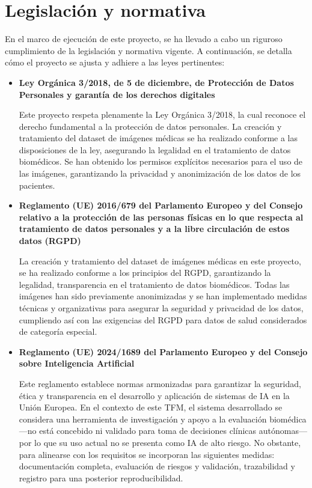 \documentclass[12pt,a4paper,onecolumn,oneside]{report}
\begin{document}
\clearpage
\section{Legislación y normativa}
\label{Legislación y normativa}

En el marco de ejecución de este proyecto, se ha llevado a cabo un riguroso cumplimiento de la legislación y normativa vigente. A continuación, 
se detalla cómo el proyecto se ajusta y adhiere a las leyes pertinentes:

\begin{itemize}
    \item \textbf{Ley Orgánica 3/2018, de 5 de diciembre, de Protección de Datos Personales y garantía de los derechos digitales}\cite{LOPD2018}
    
    Este proyecto respeta plenamente la Ley Orgánica 3/2018, la cual reconoce el derecho fundamental a la protección de datos personales. 
    La creación y tratamiento del dataset de imágenes médicas se ha realizado conforme a las disposiciones de la ley, asegurando la legalidad en el tratamiento de datos biomédicos. 
    Se han obtenido los permisos explícitos necesarios para el uso de las imágenes, garantizando la privacidad y anonimización de los datos de los pacientes. 
    
    \item \textbf{Reglamento (UE) 2016/679 del Parlamento Europeo y del Consejo relativo a la protección de las personas físicas en lo que respecta al tratamiento de datos personales y a la libre circulación de estos datos (RGPD)}\cite{RGPD2016}

    La creación y tratamiento del dataset de imágenes médicas en este proyecto, se ha realizado conforme a los principios del RGPD, garantizando la legalidad, transparencia en el 
    tratamiento de datos biomédicos. Todas las imágenes han sido previamente anonimizadas y se han implementado medidas técnicas y organizativas 
    para asegurar la seguridad y privacidad de los datos, cumpliendo así con las exigencias del RGPD para datos de salud considerados de categoría 
    especial.
    
    \item \textbf{Reglamento (UE) 2024/1689 del Parlamento Europeo y del Consejo sobre Inteligencia Artificial}\cite{ReglamentoIA2024}

    Este reglamento establece normas armonizadas para garantizar la seguridad, ética y transparencia en el desarrollo y aplicación de sistemas de IA en la Unión Europea.  
    En el contexto de este TFM, el sistema desarrollado se considera una herramienta de investigación y apoyo a la evaluación biomédica —no está concebido ni validado para toma de decisiones clínicas autónomas— 
    por lo que su uso actual no se presenta como IA de alto riesgo. No obstante, para alinearse con los requisitos se incorporan las siguientes medidas: documentación completa, evaluación de riesgos y validación, 
    trazabilidad y registro para una posterior reproducibilidad.
    

\end{itemize}
\end{document}
